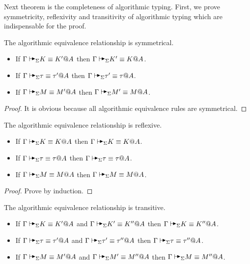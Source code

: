 Next theorem is the completeness of algorithmic typing. First, we prove
symmetricity, reflexivity and transitivity of algorithmic typing which are
indispensable for the proof.

\begin{lemma}
    The algorithmic equivalence relationship is symmetrical.
    \label{lemma:SymmetricityinAlgorithmicEquivalence}
    \begin{itemize}
        \item If \( \G \AVS K \E K' @ A \) then \( \G \AVS K' \E K @ A \).
        \item If \( \G \AVS \tau \E \tau' @ A \) then \( \G \AVS \tau' \E \tau @ A \).
        \item If \( \G \AVS M \E M' @ A \) then \( \G \AVS M' \E M @ A \).
    \end{itemize}
\end{lemma}

\begin{proof}
    It is obvious because all algorithmic equivalence rules are symmetrical.
\end{proof}

\begin{lemma}
    The algorithmic equivalence relationship is reflexive.
    \label{lemma:ReflexivityinAlgorithmicEquivalence}
    \begin{itemize}
        \item If \( \G \AVS K \E K @ A \) then \( \G \AVS K \E K @ A \).
        \item If \( \G \AVS \tau \E \tau @ A \) then \( \G \AVS \tau \E \tau @ A \).
        \item If \( \G \AVS M \E M @ A \) then \( \G \AVS M \E M @ A \).
    \end{itemize}
\end{lemma}

\begin{proof}
    Prove by induction.
\end{proof}

\begin{lemma}
    The algorithmic equivalence relationship is transitive.
    \label{lemma:TransitioninAlgorithmicEquivalence}
    \begin{itemize}
        \item If \( \G \AVS K \E K' @ A \) and \( \G \AVS K' \E K'' @ A \) then \( \G \AVS K \E K'' @ A \).
        \item If \( \G \AVS \tau \E \tau' @ A \) and \( \G \AVS \tau' \E \tau'' @ A \) then \( \G \AVS \tau \E \tau'' @ A \).
        \item If \( \G \AVS M \E M' @ A \) and \( \G \AVS M' \E M'' @ A \) then \( \G \AVS M \E M'' @ A \).
    \end{itemize}
\end{lemma}

